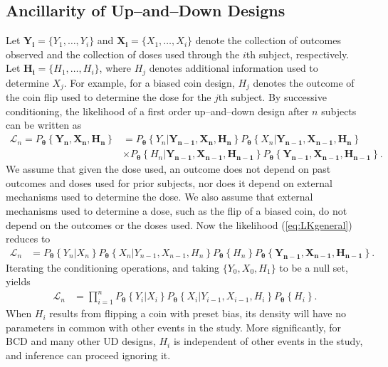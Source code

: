 \subsection{Ancillarity of Up--and--Down Designs}
Let $\mathbf{Y_i}=\{Y_1,\ldots,Y_i\}$ and $\mathbf{X_i}=\{X_1,\ldots,X_i\}$ denote the collection of outcomes observed and the collection of doses used through the $i$th subject, respectively.  Let $\mathbf{H_i}=\{H_1,\ldots,H_i\}$, where $H_j$ denotes additional information used to determine $X_j$.  For example, for a biased coin design, $H_j$ denotes the outcome of the coin flip used to determine the dose for the   $j$th subject.
By successive conditioning, the likelihood of a first order  up--and--down design after $n$ subjects can be written as 
\begin{align}\label{eq:LKgeneral}
\mathcal{L}_n=P_{\boldsymbol{\theta}}\left\{	\mathbf{Y_n}, \mathbf{X_n}, \mathbf{H_n}	\right\}
&=P_{\boldsymbol{\theta}}\left\{ 	Y_n\vert \mathbf{Y_{n-1}}, \mathbf{X_n}, \mathbf{H_n}	
\right\}
P_{\boldsymbol{\theta}}\left\{	X_n\vert \mathbf{Y_{n-1}}, \mathbf{X_{n-1}}, \mathbf{H_n}	\right\}
\nonumber \\
&\times P_{\boldsymbol{\theta}}\left\{	H_n \vert \mathbf{Y_{n-1}}, \mathbf{X_{n-1}}, \mathbf{H_{n-1}}		\right\}
P_{\boldsymbol{\theta}}\left\{	\mathbf{Y_{n-1}}, \mathbf{X_{n-1}}, \mathbf{H_{n-1}}		\right\}.
\end{align}
We assume that given the dose used, an outcome does not depend on past outcomes and doses used for prior subjects, nor  does it depend on external mechanisms used to determine the dose.  We also assume that external mechanisms used to determine a dose, such as the flip of a biased coin, do not depend on the outcomes or the doses used.  Now  the likelihood (\ref{eq:LKgeneral}) reduces to
\begin{align}
\mathcal{L}_n
&=P_{\boldsymbol{\theta}}\left\{ 	Y_n\vert X_n	\right\}
P_{\boldsymbol{\theta}}\left\{	X_n\vert  Y_{n-1}, X_{n-1}, H_n	\right\}
 P_{\boldsymbol{\theta}}\left\{	 H_n	\right\}
P_{\boldsymbol{\theta}}\left\{	\mathbf{Y_{n-1}}, \mathbf{X_{n-1}}, \mathbf{H_{n-1}}		\right\}.
\end{align}
 Iterating the conditioning operations, and taking $\{  Y_{0}, X_{0}, H_1\}$ to be a null set, yields
 \begin{align*}
\mathcal{L}_n
&=
\prod_{i=1}^n P_{\boldsymbol{\theta}}\left\{ 	Y_i\vert X_i	\right\}
P_{\boldsymbol{\theta}}\left\{	X_i\vert  Y_{i-1}, X_{i-1}, H_i	\right\}
 P_{\boldsymbol{\theta}}\left\{	 H_i	\right\}.
\end{align*}
When $H_i$ results from flipping a coin with preset bias, its density will have no parameters in common with other events in the study.  More significantly, for BCD and many other UD designs, $H_i$ is independent of other events in the study, and inference can proceed ignoring it.

